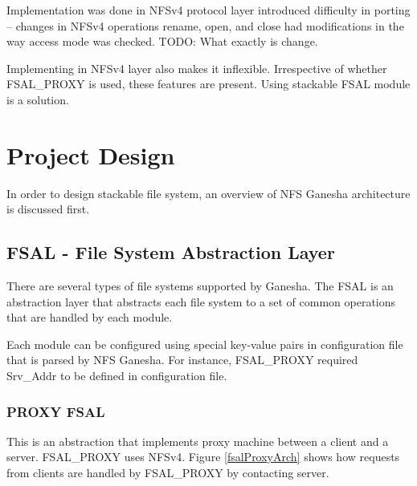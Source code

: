 \documentclass[10pt, journal, twocolumn, twoside]{IEEEtran}
\begin{document}
Implementation was done in NFSv4 protocol layer introduced difficulty in porting --
changes in NFSv4 operations rename, open, and close had modifications in the way
access mode was checked. TODO: What exactly is change.

Implementing in NFSv4 layer also makes it inflexible. Irrespective of whether FSAL\_PROXY
is used, these features are present. Using stackable FSAL module is a solution.

\section{Project Design}
In order to design stackable file system, an overview of NFS
Ganesha architecture is discussed first.

\subsection{FSAL - File System Abstraction Layer}
There are several types of file systems supported by Ganesha. The FSAL is an
abstraction layer that abstracts each file system to a set of common operations
that are handled by each module.

Each module can be configured using special key-value pairs in
configuration file that is parsed by NFS Ganesha. For instance, FSAL\_PROXY
required Srv\_Addr to be defined in configuration file.

\begin{figure*}[!btp]
  \centering
  \caption{Architecture of FSAL\_PROXY}
  \label{fsalProxyArch}
\end{figure*}

\subsubsection{PROXY FSAL}
This is an abstraction that implements proxy machine between a client and a
server. FSAL\_PROXY uses NFSv4. Figure \ref{fsalProxyArch} shows how requests
from clients are handled by FSAL\_PROXY by contacting server.
\end{document}

